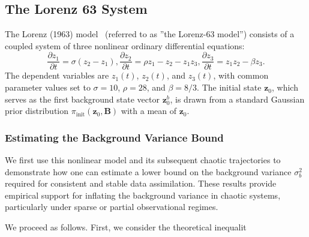 \documentclass[final,1p,times]{elsarticle}
\begin{document}
\subsection{The Lorenz 63 System}
The Lorenz (1963) model~\cite{Lorenz1963} (referred to as ''the Lorenz-63 model'') consists of a coupled system of three nonlinear ordinary differential equations:
\begin{equation}
\frac{\partial z_{1}}{\partial t}=\sigma(z_{2}-z_{1}), \frac{\partial z_{2}}{\partial t}=\rho z_{1}-z_{2}-z_{1} z_{3}, \frac{\partial z_{3}}{\partial t}=z_{1} z_{2}-\beta z_{3}.\label{eq:lorenz63}
\end{equation}
The dependent variables are $ z_{1}(t) $, $ z_{2}(t) $, and $ z_{3}(t)$, with common parameter values set to $ \sigma = 10 $, $ \rho = 28 $, and $ \beta = 8/3 $. 
The initial state $ \mathbf{z}_{0} $, which serves as the first background state vector $ \mathbf{z}_0^b $, is drawn from a standard Gaussian prior distribution $ \pi_{\mathrm{init}} \left(\mathbf{z}_{0}, \mathbf{B} \right) $ with a mean of $ \mathbf{z}_{0}$. 
\subsubsection{Estimating the Background Variance Bound}
We first use this nonlinear model and its subsequent chaotic trajectories to demonstrate how one can estimate a lower bound on the background variance $ \sigma_b^2 $ required for consistent and stable data assimilation. These results provide empirical support for inflating the background variance in chaotic systems, particularly under sparse or partial observational regimes.

We proceed as follows. First, we consider the theoretical inequalit
\end{document}
